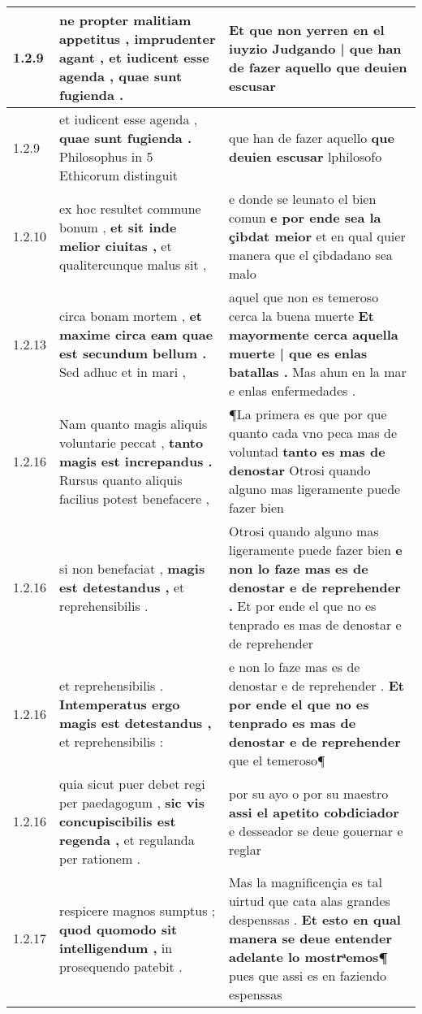 \begin{tabular}{|p{1cm}|p{6.5cm}|p{6.5cm}|}
1.2.9 & ne propter malitiam appetitus , imprudenter agant , \textbf{ et iudicent esse agenda , } quae sunt fugienda . & Et que non yerren en el iuyzio \textbf{ Judgando | que han de fazer aquello } que deuien escusar \\\hline
1.2.9 & et iudicent esse agenda , \textbf{ quae sunt fugienda . } Philosophus in 5 Ethicorum distinguit & que han de fazer aquello \textbf{ que deuien escusar } lphilosofo \\\hline
1.2.10 & ex hoc resultet commune bonum , \textbf{ et sit inde melior ciuitas , } et qualitercunque malus sit , & e donde se leunato el bien comun \textbf{ e por ende sea la çibdat meior } et en qual quier manera que el çibdadano sea malo \\\hline
1.2.13 & circa bonam mortem , \textbf{ et maxime circa eam quae est secundum bellum . } Sed adhuc et in mari , & aquel que non es temeroso cerca la buena muerte \textbf{ Et mayormente cerca aquella muerte | que es enlas batallas . } Mas ahun en la mar e enlas enfermedades . \\\hline
1.2.16 & Nam quanto magis aliquis voluntarie peccat , \textbf{ tanto magis est increpandus . } Rursus quanto aliquis facilius potest benefacere , & ¶La primera es que por que quanto cada vno peca mas de voluntad \textbf{ tanto es mas de denostar } Otrosi quando alguno mas ligeramente puede fazer bien \\\hline
1.2.16 & si non benefaciat , \textbf{ magis est detestandus , } et reprehensibilis . & Otrosi quando alguno mas ligeramente puede fazer bien \textbf{ e non lo faze mas es de denostar e de reprehender . } Et por ende el que no es tenprado es mas de denostar e de reprehender \\\hline
1.2.16 & et reprehensibilis . \textbf{ Intemperatus ergo magis est detestandus , } et reprehensibilis : & e non lo faze mas es de denostar e de reprehender . \textbf{ Et por ende el que no es tenprado es mas de denostar e de reprehender } que el temeroso¶ \\\hline
1.2.16 & quia sicut puer debet regi per paedagogum , \textbf{ sic vis concupiscibilis est regenda , } et regulanda per rationem . & por su ayo o por su maestro \textbf{ assi el apetito cobdiciador } e desseador se deue gouernar e reglar \\\hline
1.2.17 & respicere magnos sumptus ; \textbf{ quod quomodo sit intelligendum , } in prosequendo patebit . & Mas la magnificençia es tal uirtud que cata alas grandes despenssas . \textbf{ Et esto en qual manera se deue entender adelante lo mostrͣemos¶ } pues que assi es en faziendo espenssas \\\hline

\end{tabular}
